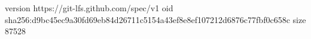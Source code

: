 version https://git-lfs.github.com/spec/v1
oid sha256:d9bc45ec9a30fd69eb84d26711c5154a43ef8e8ef107212d6876c77fbf0c658c
size 87528
